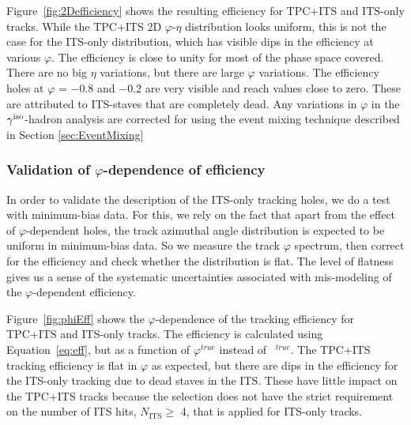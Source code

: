 Figure~\ref{fig:2Defficiency} shows the resulting efficiency for TPC+ITS and ITS-only tracks. While the TPC+ITS 2D $\varphi$-$\eta$ distribution looks uniform, this is not the case for the ITS-only distribution, which has visible dips in the efficiency at various $\varphi$. The efficiency is close to unity for most of the phase space covered. There are no big $\eta$ variations, but there are large $\varphi$ variations. The efficiency holes at $\varphi$ = $-$0.8 and $-$0.2 are very visible and reach values close to zero. These are attributed to ITS-staves that are completely dead. Any variations in $\varphi$ in the $\gamma^\mathrm{iso}$-hadron analysis are corrected for using the event mixing technique described in Section \ref{sec:EventMixing}

\subsubsection{Validation of $\varphi$-dependence of efficiency}
\label{sec:phicheck}

In order to validate the description of the ITS-only tracking holes, we do a test with minimum-bias data. For this, we rely on the fact that apart from the effect of $\varphi$-dependent holes, the track azimuthal angle distribution is expected to be uniform in minimum-bias data. So we measure the track $\varphi$ spectrum, then correct for the efficiency and check whether the distribution is flat. The level of flatness gives us a sense of the systematic uncertainties associated with mis-modeling of the $\varphi$-dependent efficiency.

Figure~\ref{fig:phiEff} shows the $\varphi$-dependence of the tracking efficiency for TPC+ITS and ITS-only tracks. The efficiency is calculated using Equation~\ref{eq:eff}, but as a function of $\varphi^{true}$ instead of \pt~$^{true}$. The TPC+ITS tracking efficiency is flat in $\varphi$ as expected, but there are dips in the efficiency for the ITS-only tracking due to dead staves in the ITS. These have little impact on the TPC+ITS tracks because the selection does not have the strict requirement on the number of ITS hits, $N_{\mathrm{ITS}} \geq$ 4, that is applied for ITS-only tracks. 

